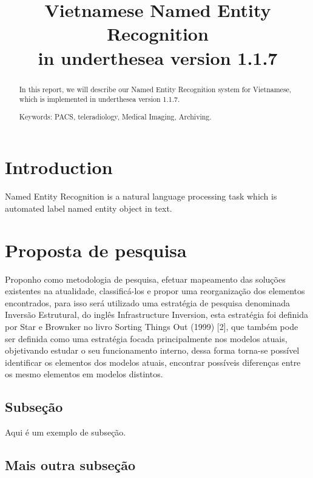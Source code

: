 \documentclass[conference]{IEEEtran}
\title{Vietnamese Named Entity Recognition \\ in underthesea version 1.1.7}
\author{
\IEEEauthorblockN{Vu Anh}
\IEEEauthorblockA{underthesea\\ anhv.ict91@gmail.com}
\and
\IEEEauthorblockN{Bui Nhat Anh}
\IEEEauthorblockA{underthesea\\ nhatanhbui.96@gmail.com}
}
\begin{document}
\maketitle
\thispagestyle{empty}
\pagestyle{empty}


\begin{abstract}

In this report, we will describe our Named Entity Recognition system for Vietnamese, which is implemented in underthesea version 1.1.7.


Keywords: PACS, teleradiology, Medical Imaging, Archiving.

\end{abstract}


\section{Introduction}

Named Entity Recognition is a natural language processing task which is automated label named entity object in text.


\section{Proposta de pesquisa}

Proponho como metodologia de pesquisa, efetuar mapeamento das soluções existentes na atualidade, classificá-los e propor uma reorganização dos elementos encontrados, para isso  será utilizado uma estratégia de pesquisa denominada Inversão Estrutural, do inglês Infrastructure Inversion, esta estratégia foi definida por Star e Brownker no livro Sorting Things Out (1999) [2], que também pode ser definida como uma estratégia focada principalmente nos modelos atuais, objetivando estudar o seu funcionamento interno, dessa forma torna-se possível identificar os elementos dos modelos atuais, encontrar possíveis diferenças entre os mesmo elementos em modelos distintos.

\subsection{Subseção}

Aqui é um exemplo de subseção.

\subsection{Mais outra subseção}
\end{document}
